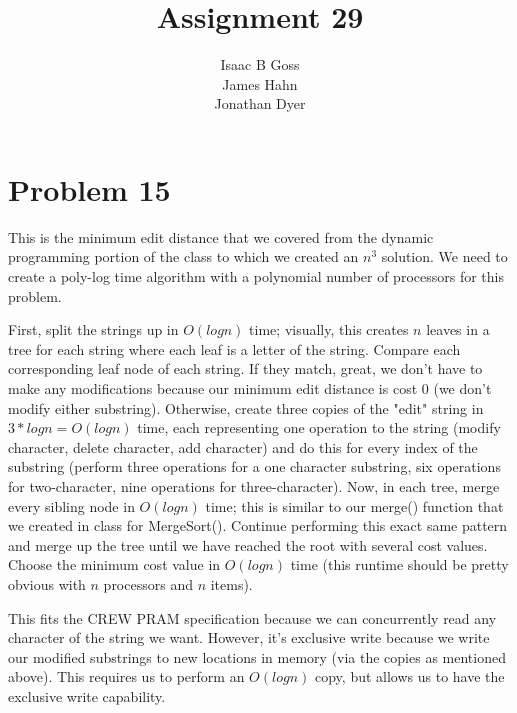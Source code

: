 \documentclass{article}
\author{Isaac B Goss\\ James Hahn\\ Jonathan Dyer}
\title{Assignment 29}
\providecommand{\prob}[1]{\section*{Problem #1}}
\begin{document}
\maketitle

\prob{15}
This is the minimum edit distance that we covered from the dynamic programming portion of the class to which we created an $n^3$ solution.  We need to create a poly-log time algorithm with a polynomial number of processors for this problem.

First, split the strings up in $O(logn)$ time; visually, this creates $n$ leaves in a tree for each string where each leaf is a letter of the string.  Compare each corresponding leaf node of each string.  If they match, great, we don't have to make any modifications because our minimum edit distance is cost 0 (we don't modify either substring).  Otherwise, create three copies of the "edit" string in $3*logn = O(logn)$ time, each representing one operation to the string (modify character, delete character, add character) and do this for every index of the substring (perform three operations for a one character substring, six operations for two-character, nine operations for three-character).  Now, in each tree, merge every sibling node in $O(logn)$ time; this is similar to our merge() function that we created in class for MergeSort().  Continue performing this exact same pattern and merge up the tree until we have reached the root with several cost values.  Choose the minimum cost value in $O(logn)$ time (this runtime should be pretty obvious with $n$ processors and $n$ items).

This fits the CREW PRAM specification because we can concurrently read any character of the string we want.  However, it's exclusive write because we write our modified substrings to new locations in memory (via the copies as mentioned above).  This requires us to perform an $O(logn)$ copy, but allows us to have the exclusive write capability.
\end{document}
